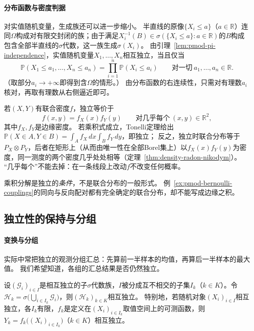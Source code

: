 \paragraph{分布函数与密度判据}
对实值随机变量，生成族还可以进一步缩小。
半直线的原像$\{X_i\le a\}$（$a\in\mathbb R$）连同$\Omega$构成对有限交封闭的族；由于满足$X_i^{-1}(B)\in\sigma(\{X_i\le a\}:a\in\mathbb R)$的$B$构成包含全部半直线的$\sigma$代数，这一族生成$\sigma(X_i)$。
由引理~\ref{lem:pmod-pi-independence}，实值随机变量$X_1,\dots,X_n$相互独立，当且仅当
\begin{equation}
  \mathbb P(X_1\le a_1,\dots,X_n\le a_n)=\prod_{i=1}^n\mathbb P(X_i\le a_i)\qquad\text{对一切}\ a_1,\dots,a_n\in\mathbb R.
  \label{eq:pmod-cdf-factorization}
\end{equation}
（取部分$a_i\to+\infty$即得到含$\Omega$的情形。）
由分布函数的右连续性，只需对有理数$a_i$核对，再取有理数从右侧逼近即可。

若$(X,Y)$有联合密度$f$，独立等价于
\[
  f(x,y)=f_X(x)f_Y(y)\qquad\text{对几乎每个}\ (x,y)\in\mathbb R^2,
\]
其中$f_X,f_Y$是边缘密度。
若乘积式成立，Tonelli定理给出$\mathbb P(X\in A,Y\in B)=\int_Af_X\,dx\int_Bf_Y\,dy$，即独立；
反之，独立时联合分布等于$P_X\otimes P_Y$，后者在矩形上（从而由唯一性在全部Borel集上）以$f_X(x)f_Y(y)$为密度，同一测度的两个密度几乎处处相等（定理~\ref{thm:density-radon-nikodym}）。
“几乎每个”不能去掉：在一条线段上改动$f$不改变任何概率。

乘积分解是独立的\emph{条件}，不是联合分布的一般形式。
例~\ref{ex:pmod-bernoulli-couplings}的同向与反向配对都有完全确定的联合分布，却不能写成边缘之积。

\subsection{独立性的保持与分组}

\paragraph{变换与分组}
实际中常把独立的观测分组汇总：先算前一半样本的均值，再算后一半样本的最大值。
我们希望知道，各组的汇总结果是否仍然独立。

\begin{theorem}[分组与变换保持独立]
\label{thm:pmod-independence-grouping}
设$(\mathcal G_i)_{i\in I}$是相互独立的子$\sigma$代数族，$I$被分成互不相交的子集$I_k$（$k\in K$）。令
$\mathcal H_k=\sigma\bigl(\bigcup_{i\in I_k}\mathcal G_i\bigr)$，则$(\mathcal H_k)_{k\in K}$相互独立。
特别地，若随机对象$(X_i)_{i\in I}$相互独立，各$I_k$有限，$f_k$是定义在$(X_i)_{i\in I_k}$取值空间上的可测函数，则$Y_k=f_k\bigl((X_i)_{i\in I_k}\bigr)$（$k\in K$）相互独立。
\end{theorem}

